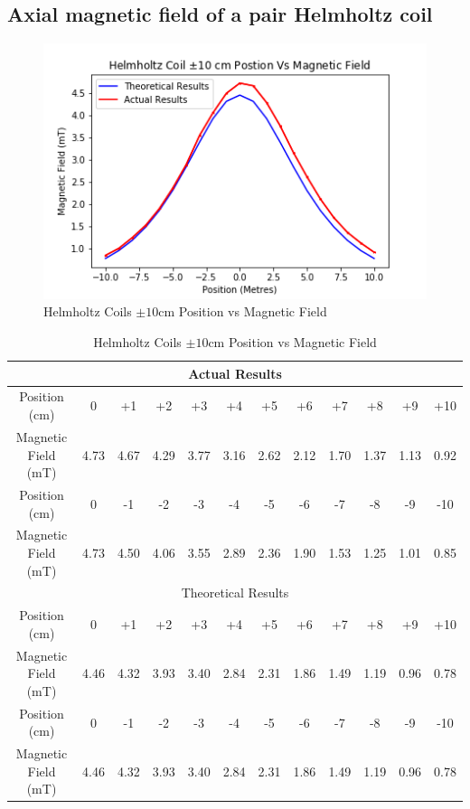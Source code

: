 \documentclass[12pt]{article}
\begin{document}
\subsection{Axial magnetic field of a pair Helmholtz coil}
\label{Axial magnetic field of a pair Helmholtz coil}

\begin{figure}[H]
\centering
\includegraphics[scale=0.7]{Images/Helmholtz_Coils/Helmholtz_Coil_Position_Vs_Magnetic_Field.png}
\caption{Helmholtz Coils $\pm10$cm Position vs Magnetic Field}
\label{Helmholtz Coil 10 Positon Vs Magnetic Field Graph}
\end{figure}

\begin{table}[H]
\begin{center}
 \footnotesize
 \begin{tabular}{|c||c|c|c|c|c|c|c|c|c|c|c|}
 \hline
 \multicolumn{12}{|c|}{Actual Results} \\
 \hline
 Position (cm) & 0 & +1 & +2 & +3 & +4 & +5 & +6 & +7 & +8 & +9 & +10 \\
 \hline
 Magnetic Field (mT) & 4.73 & 4.67 & 4.29 & 3.77 & 3.16 & 2.62 & 2.12 & 1.70 & 1.37 & 1.13 & 0.92 \\
 \hline \hline
 Position (cm) & 0 & -1 & -2 & -3 & -4 & -5 & -6 & -7 & -8 & -9 & -10 \\
 \hline
 Magnetic Field (mT) & 4.73 & 4.50 & 4.06 & 3.55 & 2.89 & 2.36 & 1.90 & 1.53 & 1.25 & 1.01 & 0.85 \\
 \hline
 \hline
 \multicolumn{12}{|c|}{Theoretical Results} \\
 \hline
 Position (cm) & 0 & +1 & +2 & +3 & +4 & +5 & +6 & +7 & +8 & +9 & +10 \\
 \hline
 Magnetic Field (mT) & 4.46 & 4.32 & 3.93 & 3.40 & 2.84 & 2.31 & 1.86 & 1.49 & 1.19 & 0.96 & 0.78 \\
 \hline \hline
 Position (cm) & 0 & -1 & -2 & -3 & -4 & -5 & -6 & -7 & -8 & -9 & -10 \\
 \hline
 Magnetic Field (mT) & 4.46 & 4.32 & 3.93 & 3.40 & 2.84 & 2.31 & 1.86 & 1.49 & 1.19 & 0.96 & 0.78 \\
 \hline
 \end{tabular}
 \caption{Helmholtz Coils $\pm10$cm Position vs Magnetic Field}
 \label{Helmholtz Coil Postion Vs Magnetic Field Table}
\end{center}
\end{table}
\end{document}
